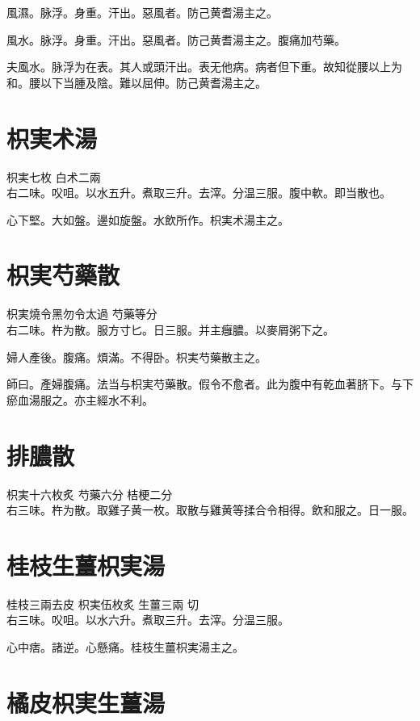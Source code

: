 風濕。脉浮。身重。汗出。惡風者。防己黄耆湯主之。

風水。脉浮。身重。汗出。惡風者。防己黄耆湯主之。腹痛加芍藥。

夫風水。脉浮为在表。其人或頭汗出。表无他病。病者但下重。故知從腰以上为和。腰以下当腫及陰。難以屈伸。防己黄耆湯主之。

\section{枳実术湯}

枳実{\scriptsize 七枚} 白术{\scriptsize 二兩}\\
右二味。㕮咀。以水五升。煮取三升。去滓。分温三服。腹中軟。即当散也。

心下堅。大如盤。邊如旋盤。水飲所作。枳{\khaaitp 実}术湯主之。

\section{枳実芍藥散}

枳実{\scriptsize 燒令黑勿令太過} 芍藥{\scriptsize 等分}\\
右二味。杵为散。服方寸匕。日三服。并主癰膿。以麥屑粥下之。

{\khaaitp 婦人}產後。腹痛。煩滿。不得卧。枳実芍藥散主之。

師曰。產婦腹痛。法当与枳実芍藥散。假令不愈者。此为腹中有乾血著脐下。与下瘀血湯服之。{\khaaitp 亦}主經水不利。

\section{排膿散}

枳実{\scriptsize 十六枚炙} 芍藥{\scriptsize 六分} 桔梗{\scriptsize 二分}\\
右三味。杵为散。取雞子黄一枚。取散与雞黄等揉合令相得。飲和服之。日一服。

\section{桂枝生薑枳実湯}

桂枝{\scriptsize 三兩去皮} 枳実{\scriptsize 伍枚炙} 生薑{三兩 切}\\
右三味。㕮咀。以水六升。煮取三升。去滓。分温三服。

心中痞。諸逆。心懸痛。桂枝生薑枳実湯主之。

\section{橘{\khaaitp 皮}枳{\khaaitp 実生}薑湯}

